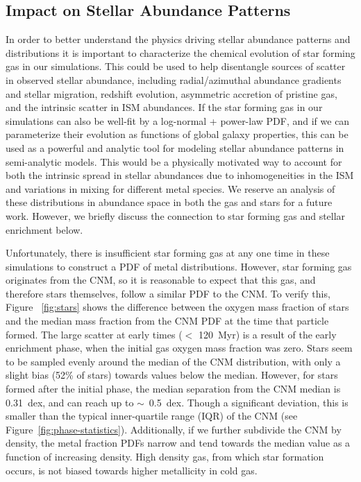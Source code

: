 \documentclass[twocolumn]{aastex61}
\begin{document}
\subsection{Impact on Stellar Abundance Patterns}
\label{sec:stellar abundances}
In order to better understand the physics driving stellar abundance patterns and distributions it is important to characterize the chemical evolution of star forming gas in our simulations. This could be used to help disentangle sources of scatter in observed stellar abundance, including radial/azimuthal abundance gradients and stellar migration, redshift evolution, asymmetric accretion of pristine gas, and the intrinsic scatter in ISM abundances. If the star forming gas in our simulations can also be well-fit by a log-normal + power-law PDF, and if we can parameterize their evolution as functions of global galaxy properties, this can be used as a powerful and analytic tool for modeling stellar abundance patterns in semi-analytic models. This would be a physically motivated way to account for both the intrinsic spread in stellar abundances due to inhomogeneities in the ISM and variations in mixing for different metal species. We reserve an analysis of these distributions in abundance space in both the gas and stars for a future work. However, we briefly discuss the connection to star forming gas and stellar enrichment below.

Unfortunately, there is insufficient star forming gas at any one time in these simulations to construct a PDF of metal distributions. However, star forming gas originates from the CNM, so it is reasonable to expect that this gas, and therefore stars themselves, follow a similar PDF to the CNM. To verify this, Figure ~\ref{fig:stars} shows the difference between the oxygen mass fraction of stars and the median mass fraction from the CNM PDF at the time that particle formed. The large scatter at early times ($<$ 120~Myr) is a result of the early enrichment phase, when the initial gas oxygen mass fraction was zero. Stars seem to be sampled evenly around the median of the CNM distribution, with only a slight bias (52\% of stars) towards values below the median. However, for stars formed after the initial phase, the median separation from the CNM median is 0.31~dex, and can reach up to $\sim$~0.5~dex. Though a significant deviation, this is smaller than the typical inner-quartile range (IQR) of the CNM (see Figure~\ref{fig:phase-statistics}). Additionally, if we further subdivide the CNM by density, the metal fraction PDFs narrow and tend towards the median value as a function of increasing density. High density gas, from which star formation occurs, is not biased towards higher metallicity in cold gas.
\end{document}
